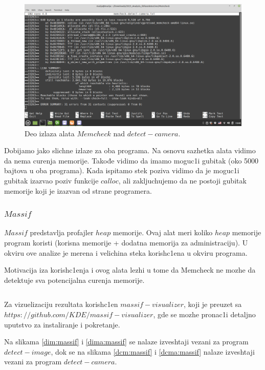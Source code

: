 \documentclass{article}
\begin{document}
\begin{figure}[H]
    \centering
    \includegraphics[width=12cm]{img/memcheck/memcheck_detect_camera.png}
    \caption{Deo izlaza alata $Memcheck$ nad $detect-camera.$}
    \label{dc:mcheck}
\end{figure}
Dobijamo jako slichne izlaze za oba programa. Na osnovu sazhetka alata vidimo da nema curenja memorije. 
Takođe vidimo da imamo moguc1i gubitak (oko 5000 bajtova u oba programa). Kada ispitamo stek poziva vidimo da je moguc1i gubitak izazvao poziv funkcije $calloc$, ali zakljuchujemo da ne postoji gubitak memorije koji je izazvan od strane programera.
\subsubsection{$Massif$}
\selectfont
$Massif$ predstavlja profajler $heap$ memorije. Ovaj alat meri koliko $heap$ memorije program koristi (korisna memorije + dodatna memorija za administraciju). U okviru ove analize je merena i velichina steka korish\-c1ena u okviru programa.

Motivacija iza korishc1enja i ovog alata lezhi u tome da Memcheck ne mozhe da detektuje sva potencijalna curenja memorije.

\selectfont
\inputminted[fistline=3, lastline=6]{shell-session}{run_massif.sh}
\selectfont
Za vizuelizaciju rezultata korish\-c1en $massif-visualizer$, koji je preuzet sa \href{https://github.com/KDE/massif-visualizer}{$https://github.com/KDE/massif-visualizer$}, gde se mozhe pronac1i detaljno uput\-stvo za instaliranje i pokretanje.

Na slikama \ref{dim:massif} i \ref{dima:massif} se nalaze izveshtaji vezani za program $detect-image$, dok se na slikama \ref{dcm:massif} i \ref{dcma:massif} nalaze izveshtaji vezani za program $detect-camera$. 
\end{document}
